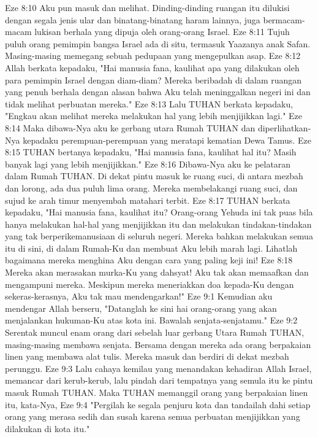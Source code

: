 Eze 8:10  Aku pun masuk dan melihat. Dinding-dinding ruangan itu dilukisi dengan segala jenis ular dan binatang-binatang haram lainnya, juga bermacam-macam lukisan berhala yang dipuja oleh orang-orang Israel.
Eze 8:11  Tujuh puluh orang pemimpin bangsa Israel ada di situ, termasuk Yaazanya anak Safan. Masing-masing memegang sebuah pedupaan yang mengepulkan asap.
Eze 8:12  Allah berkata kepadaku, "Hai manusia fana, kaulihat apa yang dilakukan oleh para pemimpin Israel dengan diam-diam? Mereka beribadah di dalam ruangan yang penuh berhala dengan alasan bahwa Aku telah meninggalkan negeri ini dan tidak melihat perbuatan mereka."
Eze 8:13  Lalu TUHAN berkata kepadaku, "Engkau akan melihat mereka melakukan hal yang lebih menjijikkan lagi."
Eze 8:14  Maka dibawa-Nya aku ke gerbang utara Rumah TUHAN dan diperlihatkan-Nya kepadaku perempuan-perempuan yang meratapi kematian Dewa Tamus.
Eze 8:15  TUHAN bertanya kepadaku, "Hai manusia fana, kaulihat hal itu? Masih banyak lagi yang lebih menjijikkan."
Eze 8:16  Dibawa-Nya aku ke pelataran dalam Rumah TUHAN. Di dekat pintu masuk ke ruang suci, di antara mezbah dan lorong, ada dua puluh lima orang. Mereka membelakangi ruang suci, dan sujud ke arah timur menyembah matahari terbit.
Eze 8:17  TUHAN berkata kepadaku, "Hai manusia fana, kaulihat itu? Orang-orang Yehuda ini tak puas bila hanya melakukan hal-hal yang menjijikkan itu dan melakukan tindakan-tindakan yang tak berperikemanusiaan di seluruh negeri. Mereka bahkan melakukan semua itu di sini, di dalam Rumah-Ku dan membuat Aku lebih marah lagi. Lihatlah bagaimana mereka menghina Aku dengan cara yang paling keji ini!
Eze 8:18  Mereka akan merasakan murka-Ku yang dahsyat! Aku tak akan memaafkan dan mengampuni mereka. Meskipun mereka meneriakkan doa kepada-Ku dengan sekeras-kerasnya, Aku tak mau mendengarkan!"
Eze 9:1  Kemudian aku mendengar Allah berseru, "Datanglah ke sini hai orang-orang yang akan menjalankan hukuman-Ku atas kota ini. Bawalah senjata-senjatamu."
Eze 9:2  Serentak muncul enam orang dari sebelah luar gerbang Utara Rumah TUHAN, masing-masing membawa senjata. Bersama dengan mereka ada orang berpakaian linen yang membawa alat tulis. Mereka masuk dan berdiri di dekat mezbah perunggu.
Eze 9:3  Lalu cahaya kemilau yang menandakan kehadiran Allah Israel, memancar dari kerub-kerub, lalu pindah dari tempatnya yang semula itu ke pintu masuk Rumah TUHAN. Maka TUHAN memanggil orang yang berpakaian linen itu, kata-Nya,
Eze 9:4  "Pergilah ke segala penjuru kota dan tandailah dahi setiap orang yang merasa sedih dan susah karena semua perbuatan menjijikkan yang dilakukan di kota itu."
